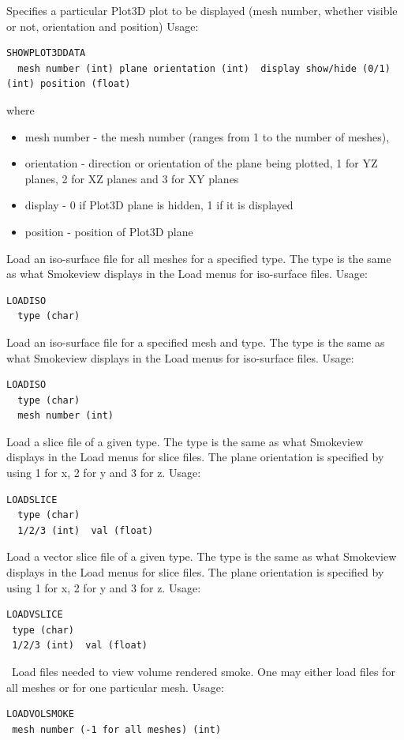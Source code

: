 \documentclass[11pt,twoside]{book}
\newcommand{\hitem}[1]{\item[{\bf #1} \hfill]}
\begin{document}
\hitem{SHOWPLOT3DDATA}Specifies a particular Plot3D plot to be
displayed (mesh number, whether visible or not, orientation and position)
Usage:
\begin{lstlisting}
SHOWPLOT3DDATA
  mesh number (int) plane orientation (int)  display show/hide (0/1) (int) position (float)
\end{lstlisting}
where
\begin{itemize}
\item mesh number - the mesh number (ranges from 1 to the number of meshes),
\item orientation - direction or orientation of the plane being plotted, 1 for YZ planes, 2 for XZ planes and 3 for XY planes
\item display - 0 if Plot3D plane is hidden, 1 if it is displayed
\item position - position of Plot3D plane
\end{itemize}

\hitem{LOADISO}Load an iso-surface file for all meshes for a specified type.
The type is the same as what Smokeview displays in the Load menus for iso-surface files.
Usage:
\begin{lstlisting}
LOADISO
  type (char)
\end{lstlisting}

\hitem{LOADISOM}Load an iso-surface file for a specified mesh and type.
The type is the same as what Smokeview displays in the Load menus for iso-surface files.
Usage:
\begin{lstlisting}
LOADISO
  type (char)
  mesh number (int)
\end{lstlisting}

\hitem{LOADSLICE}Load a slice file of a given type.
The type is the same as what Smokeview displays in the Load menus for slice files.  The plane orientation is specified by using 1 for x, 2 for y and 3 for z.
Usage:
\begin{lstlisting}
LOADSLICE
  type (char)
  1/2/3 (int)  val (float)
\end{lstlisting}

\hitem{LOADVSLICE}Load a vector slice file of a given type.
The type is the same as what Smokeview displays in the
Load menus for slice files.  The plane orientation is
specified by using 1 for x, 2 for y and 3 for z.
Usage:
\begin{lstlisting}
LOADVSLICE
 type (char)
 1/2/3 (int)  val (float)
\end{lstlisting}

\hitem{LOADVOLSMOKE}\ Load files needed to view volume rendered
smoke.  One may either load files for all meshes or for one
particular mesh.  Usage:
\begin{lstlisting}
LOADVOLSMOKE
 mesh number (-1 for all meshes) (int)
 \end{lstlisting}
\end{document}
